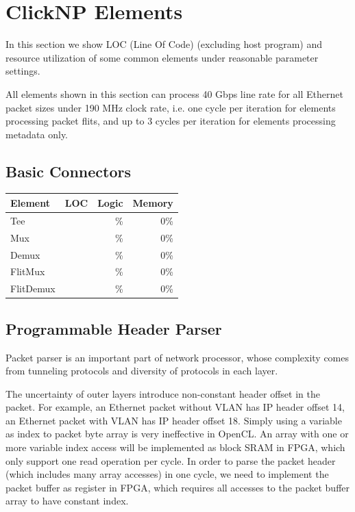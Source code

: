 \section{ClickNP Elements}
\label{sec:elements}

In this section we show LOC (Line Of Code) (excluding host program) and resource utilization of some common elements under reasonable parameter settings.

All elements shown in this section can process 40 Gbps line rate for all Ethernet packet sizes under 190 MHz clock rate, i.e. one cycle per iteration for elements processing packet flits, and up to 3 cycles per iteration for elements processing metadata only.

\subsection{Basic Connectors}

\begin{table}[h!]
	\centering
	\label{tab:Basic Connectors}
	\begin{tabular}{l|r|r|r}
		Element & LOC & Logic & Memory \\
		\hline
		Tee	&  & \%  & 0\% \\
		Mux	&  & \% & 0\% \\
		Demux & & \% & 0\% \\
		FlitMux & & \% & 0\% \\
		FlitDemux & & \% & 0\% \\
	\end{tabular}
\end{table}


\subsection{Programmable Header Parser}

Packet parser is an important part of network processor, whose complexity comes from tunneling protocols and diversity of protocols in each layer.

The uncertainty of outer layers introduce non-constant header offset in the packet. For example, an Ethernet packet without VLAN has IP header offset 14, an Ethernet packet with VLAN has IP header offset 18. Simply using a variable as index to packet byte array is very ineffective in OpenCL. An array with one or more variable index access will be implemented as block SRAM in FPGA, which only support one read operation per cycle. In order to parse the packet header (which includes many array accesses) in one cycle, we need to implement the packet buffer as register in FPGA, which requires all accesses to the packet buffer array to have constant index.

